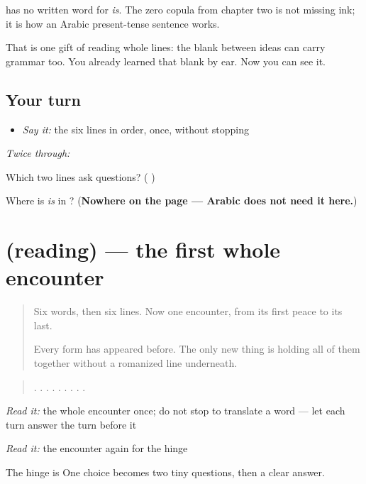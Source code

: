 \begin{cousinweb}
\textbf{ } has no written word for \emph{is}. The zero copula from chapter two is not missing ink; it is how an Arabic present-tense sentence works.

That is one gift of reading whole lines: the blank between ideas can carry grammar too. You already learned that blank by ear. Now you can see it.
\end{cousinweb}

\subsection*{Your turn}
\begin{itemize}
\raggedright
  \item \emph{Say it:} the six lines in order, once, without stopping
\end{itemize}

\emph{Twice through:}

\begin{tcolorbox}[breakable,colback=teal!4,colframe=teal!35!black,title={Before you move on}]
Which two lines ask questions? (\textbf{    })

Where is \emph{is} in \textbf{ }? (\textbf{Nowhere on the page — Arabic does not need it here.})
\end{tcolorbox}
\section[(reading)]{(reading) — the first whole encounter}

\label{lesson:AR-C42-first-passage}



\begin{quote}
Six words, then six lines. Now one encounter, from its first peace to its last.

Every form has appeared before. The only new thing is holding all of them together without a romanized line underneath.
\end{quote}

\begin{tcolorbox}[breakable,skin=enhanced,colback=orange!6,colframe=orange!45!black,boxrule=0.5pt,arc=1mm,left=6pt,right=6pt,top=4pt,bottom=4pt,fonttitle=\bfseries,title={Read this}]
\begin{quote}
 .  .    .   .     .  . . .  .
\end{quote}

\emph{Read it:} the whole encounter once; do not stop to translate a word — let each turn answer the turn before it

\emph{Read it:} the encounter again for the hinge

The hinge is \textbf{  } One choice becomes two tiny questions, then a clear answer.
\end{tcolorbox}

